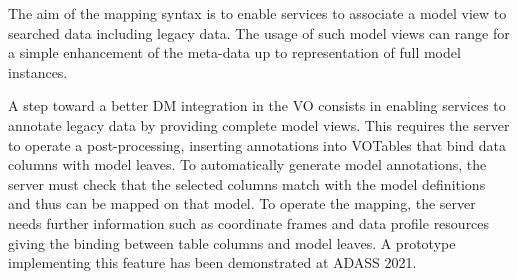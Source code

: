 The aim of the mapping syntax is to enable services to associate a model view to searched data including legacy data.
The usage of such model views can range for a simple enhancement of the meta-data up to representation of full model instances.

A step toward a better DM integration in the VO consists in enabling services to annotate
legacy data by providing complete model
views. This requires the server to operate a post-processing, inserting annotations into VOTables 
that bind data columns with model leaves.
To automatically generate model annotations, the server must check that the selected columns 
match with the model definitions and thus can be
mapped on that model. To operate the mapping, the server needs further information
such as coordinate frames and data profile resources giving the binding between table
columns and model leaves. A prototype \citep{2201.01732} implementing this feature
has been demonstrated at ADASS 2021.



